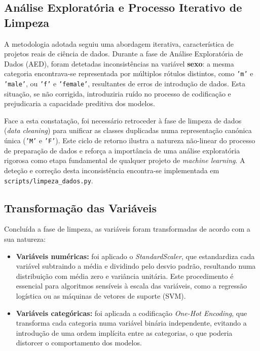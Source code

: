 \subsection{Análise Exploratória e Processo Iterativo de Limpeza}

A metodologia adotada seguiu uma abordagem iterativa, característica de projetos reais de ciência de dados. Durante a fase de Análise Exploratória de Dados (AED), foram detetadas inconsistências na variável \textbf{sexo}: a mesma categoria encontrava-se representada por múltiplos rótulos distintos, como \texttt{'m'} e \texttt{'male'}, ou \texttt{'f'} e \texttt{'female'}, resultantes de erros de introdução de dados. Esta situação, se não corrigida, introduziria ruído no processo de codificação e prejudicaria a capacidade preditiva dos modelos.

Face a esta constatação, foi necessário retroceder à fase de limpeza de dados (\textit{data cleaning}) para unificar as classes duplicadas numa representação canónica única (\texttt{'M'} e \texttt{'F'}). Este ciclo de retorno ilustra a natureza não-linear do processo de preparação de dados e reforça a importância de uma análise exploratória rigorosa como etapa fundamental de qualquer projeto de \textit{machine learning}. A deteção e correção desta inconsistência encontra-se implementada em \texttt{scripts/limpeza\_dados.py}.

\subsection{Transformação das Variáveis}

Concluída a fase de limpeza, as variáveis foram transformadas de acordo com a sua natureza:

\begin{itemize}
    \item \textbf{Variáveis numéricas:} foi aplicado o \textit{StandardScaler}, que estandardiza cada variável subtraindo a média e dividindo pelo desvio padrão, resultando numa distribuição com média zero e variância unitária. Este procedimento é essencial para algoritmos sensíveis à escala das variáveis, como a regressão logística ou as máquinas de vetores de suporte (SVM).

    \item \textbf{Variáveis categóricas:} foi aplicada a codificação \textit{One-Hot Encoding}, que transforma cada categoria numa variável binária independente, evitando a introdução de uma ordem implícita entre as categorias, o que poderia distorcer o comportamento dos modelos.
\end{itemize}

